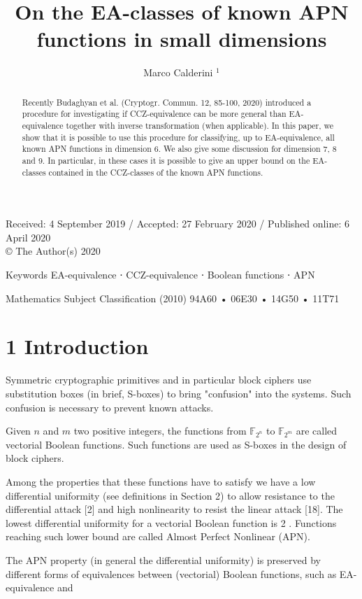 \documentclass[10pt]{article}
\title{On the EA-classes of known APN functions in small dimensions }
\author{Marco Calderini ${ }^{1}$}
\date{}
\begin{document}
\maketitle
\captionsetup{singlelinecheck=false}
Received: 4 September 2019 / Accepted: 27 February 2020 / Published online: 6 April 2020\\
© The Author(s) 2020

\begin{abstract}
Recently Budaghyan et al. (Cryptogr. Commun. 12, 85-100, 2020) introduced a procedure for investigating if CCZ-equivalence can be more general than EA-equivalence together with inverse transformation (when applicable). In this paper, we show that it is possible to use this procedure for classifying, up to EA-equivalence, all known APN functions in dimension 6. We also give some discussion for dimension 7, 8 and 9. In particular, in these cases it is possible to give an upper bound on the EA-classes contained in the CCZ-classes of the known APN functions.
\end{abstract}

Keywords EA-equivalence ⋅ CCZ-equivalence ⋅ Boolean functions ⋅ APN

Mathematics Subject Classification (2010) 94A60 • 06E30 • 14G50 • 11T71

\section*{1 Introduction}
Symmetric cryptographic primitives and in particular block ciphers use substitution boxes (in brief, S-boxes) to bring "confusion" into the systems. Such confusion is necessary to prevent known attacks.

Given $n$ and $m$ two positive integers, the functions from $\mathbb{F}_{2^{n}}$ to $\mathbb{F}_{2^{m}}$ are called vectorial Boolean functions. Such functions are used as S-boxes in the design of block ciphers.

Among the properties that these functions have to satisfy we have a low differential uniformity (see definitions in Section 2) to allow resistance to the differential attack [2] and high nonlinearity to resist the linear attack [18]. The lowest differential uniformity for a vectorial Boolean function is 2 . Functions reaching such lower bound are called Almost Perfect Nonlinear (APN).

The APN property (in general the differential uniformity) is preserved by different forms of equivalences between (vectorial) Boolean functions, such as EA-equivalence and
\end{document}
